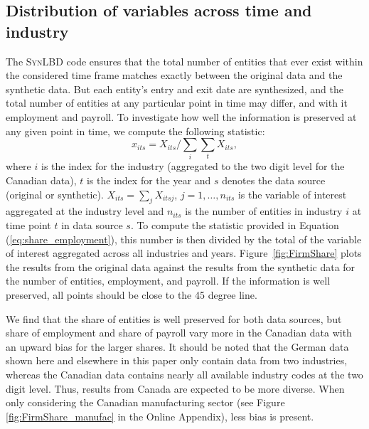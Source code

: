 \documentclass[10pt,twoside]{article}
\newcommand{\SynLBD}{\textsc{SynLBD}}
\begin{document}
\subsection{Distribution of variables across time and industry}



The \SynLBD{} code  ensures that the total number of entities that ever exist within the considered time frame  matches exactly between the original data and the synthetic data. But  each entity's entry and exit date are synthesized, and the total number of entities at any particular point in time may differ, and with it employment and payroll. To investigate how well the information is preserved at any given point in time, we compute the following statistic:
\begin{equation}
    \label{eq:share_employment}
x_{its} = X_{its}/\sum_{i} \sum_{t} X_{its}, 
\end{equation}
where $i$ is the index for the industry (aggregated to the two digit level for the Canadian data), $t$ is the index for the year and $s$ denotes the data source (original or synthetic). $X_{its}=\sum_j X_{itsj}$, $j=1,\ldots,n_{its}$ is the variable of interest aggregated at the industry level and $n_{its}$ is the number of entities in industry $i$ at time point $t$ in data source $s$. 
To compute the statistic provided in Equation (\ref{eq:share_employment}), this number is then divided by the total of the variable of interest aggregated across all industries and years.
Figure~\ref{fig:FirmShare} plots the results from the original data against the results from the synthetic data for the  number of entities, employment, and {payroll}. If the information is well preserved, all points should be close to the 45 degree line. 



We find that the share of entities is well preserved for both data sources, but share of employment and share of payroll vary more in the Canadian data with an upward bias for the larger shares. 
It should be noted that the German data shown here and elsewhere in this paper only contain data from two industries, whereas the Canadian data contains nearly all  available industry codes at the two digit level. Thus, results from Canada are expected to be more diverse. 
When only considering the Canadian manufacturing sector (see Figure \ref{fig:FirmShare_manufac} in the Online Appendix), less bias is present.
\end{document}
